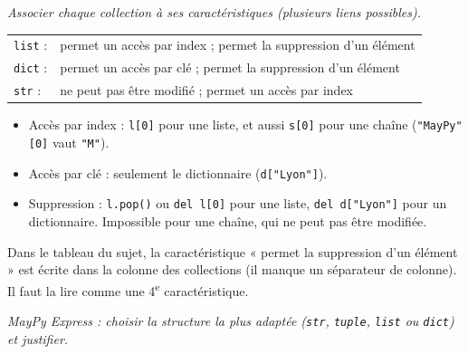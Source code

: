 \documentclass[addpoints, 11pt]{exam}
\newcommand{\enonce}[1]{\textit{#1}\par\smallskip}
\newcommand{\code}[1]{\texttt{#1}}
\DeclareRobustCommand{\_}{\textunderscore\allowbreak}
\begin{document}
\begin{questions}
\question[1] \enonce{Associer chaque collection à ses caractéristiques (plusieurs liens possibles).}
\begin{reponse}
\begin{tabular}{ll}
\code{list} : & permet un accès par index ; permet la suppression d'un élément \\
\code{dict} : & permet un accès par clé ; permet la suppression d'un élément \\
\code{str} : & ne peut pas être modifié ; permet un accès par index \\
\end{tabular}
\end{reponse}
\begin{itemize}
  \item Accès par index : \code{l[0]} pour une liste, et aussi \code{s[0]} pour une chaîne (\code{"MayPy"[0]} vaut \code{"M"}).
  \item Accès par clé : seulement le dictionnaire (\code{d["Lyon"]}).
  \item Suppression : \code{l.pop()} ou \code{del l[0]} pour une liste, \code{del d["Lyon"]} pour un dictionnaire. Impossible pour une chaîne, qui ne peut pas être modifiée.
\end{itemize}
\begin{remarque}
Dans le tableau du sujet, la caractéristique « permet la suppression d'un élément » est écrite dans la colonne des collections (il manque un séparateur de colonne). Il faut la lire comme une 4\textsuperscript{e} caractéristique.
\end{remarque}

\question[1] \enonce{MayPy Express : choisir la structure la plus adaptée (\code{str}, \code{tuple}, \code{list} ou \code{dict}) et justifier.}
\end{questions}
\end{document}
